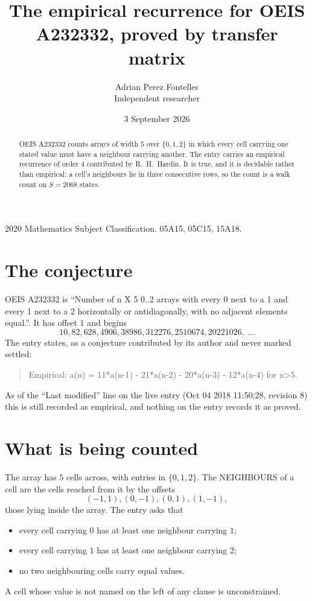 \documentclass[11pt,a4paper]{article}
\title{The empirical recurrence for OEIS A232332, proved by transfer matrix}
\author{Adrian Perez Fontelles\\ \small Independent researcher}
\date{3 September 2026}
\theoremstyle{plain}
\theoremstyle{definition}
\begin{document}
\maketitle

\begin{abstract}
OEIS A232332 counts arrays of width $5$ over $\{0,1,2\}$ in which every cell carrying one stated
value must have a neighbour carrying another. The entry carries an empirical recurrence of
order $4$ contributed by R.~H.~Hardin. It is true, and it is decidable rather than
empirical: a cell's neighbours lie in three consecutive rows, so the count is a walk count on
$S=2068$ states.
\end{abstract}

\noindent\small 2020 Mathematics Subject Classification. 05A15, 05C15, 15A18.\normalsize

\section{The conjecture}

OEIS A232332 is ``Number of n X 5 0..2 arrays with every 0 next to a 1 and every 1 next to a 2 horizontally or antidiagonally, with no adjacent elements equal.''. It has offset $1$ and begins
\[
10, 82, 628, 4906, 38986, 312276, 2510674, 20221026,\ \dots
\]
The entry states, as a conjecture contributed by its author and never marked settled:
\begin{quote}
Empirical: a(n) = 11*a(n-1) - 21*a(n-2) - 20*a(n-3) - 12*a(n-4) for n>5.
\end{quote}
As of the ``Last modified'' line on the live entry (Oct 04 2018 11:50:28, revision 8) this is still
recorded as empirical, and nothing on the entry records it as proved.

\section{What is being counted}

The array has $5$ cells across, with entries in $\{0,1,2\}$. The NEIGHBOURS of a cell are the
cells reached from it by the offsets
\[
(-1,1), (0,-1), (0,1), (1,-1),
\]
those lying inside the array. The entry asks that
\begin{itemize}
\item every cell carrying $0$ has at least one neighbour carrying $1$;
\item every cell carrying $1$ has at least one neighbour carrying $2$;
\item no two neighbouring cells carry equal values.
\end{itemize}
A cell whose value is not named on the left of any clause is unconstrained.
\end{document}

